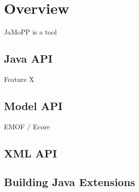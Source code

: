 \chapter{Overview}
JaMoPP is a tool 

\section{Java API}

\begin{description}
\item[Feature X]
\end{description}

\section{Model API}

EMOF / Ecore

\section{XML API}

\section{Building Java Extensions}

